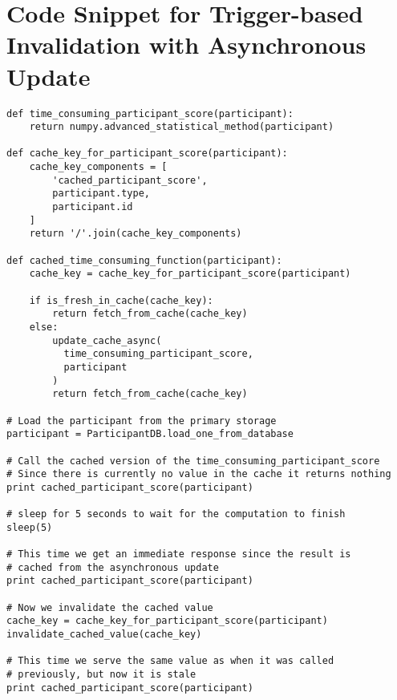 \section{Code Snippet for Trigger-based Invalidation with Asynchronous Update}
\label{appendix:code:trigger-based-invalidation-with-asynchronous-update}

\begin{verbatim}
def time_consuming_participant_score(participant):
    return numpy.advanced_statistical_method(participant)

def cache_key_for_participant_score(participant):
    cache_key_components = [
        'cached_participant_score',
        participant.type,
        participant.id
    ]
    return '/'.join(cache_key_components)

def cached_time_consuming_function(participant):
    cache_key = cache_key_for_participant_score(participant)

    if is_fresh_in_cache(cache_key):
        return fetch_from_cache(cache_key)
    else:
        update_cache_async(
          time_consuming_participant_score,
          participant
        )
        return fetch_from_cache(cache_key)

# Load the participant from the primary storage
participant = ParticipantDB.load_one_from_database

# Call the cached version of the time_consuming_participant_score
# Since there is currently no value in the cache it returns nothing
print cached_participant_score(participant)

# sleep for 5 seconds to wait for the computation to finish
sleep(5)

# This time we get an immediate response since the result is
# cached from the asynchronous update
print cached_participant_score(participant)

# Now we invalidate the cached value
cache_key = cache_key_for_participant_score(participant)
invalidate_cached_value(cache_key)

# This time we serve the same value as when it was called
# previously, but now it is stale
print cached_participant_score(participant)
\end{verbatim}

